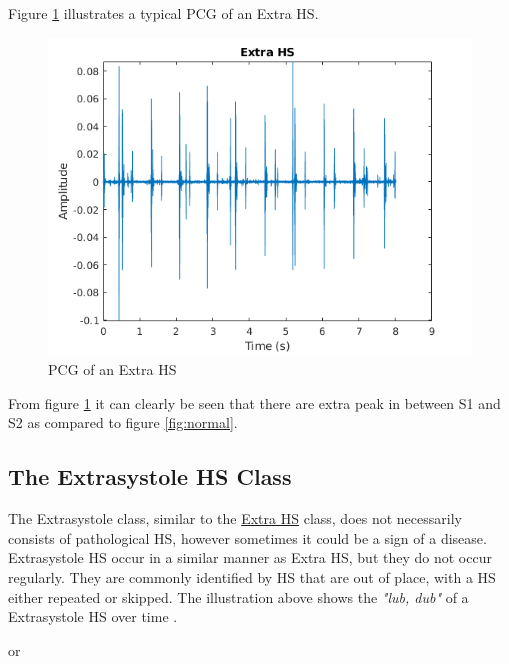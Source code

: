 \documentclass[10pt,twocolumn]{witseiepaper}
\begin{document}
Figure \ref{fig:extra} illustrates a typical PCG of an Extra HS.
\begin{figure}[h!]
    \centering
    \includegraphics[scale = 0.45]{./extra.png}
    \caption{PCG of an Extra HS}
    \label{fig:extra}
\end{figure}{}

From figure \ref{fig:extra} it can clearly be seen that there are extra peak in between S1 and S2 as compared to figure \ref{fig:normal}.

\subsection*{The Extrasystole HS Class}
The Extrasystole class, similar to the \hyperref[sec:extra]{Extra HS} class, does not necessarily consists of pathological HS, however sometimes it could be a sign of a disease. Extrasystole HS occur in a similar manner as Extra HS, but they do not occur regularly. They are commonly identified by HS that are out of place, with a HS either repeated or skipped. The illustration above shows the \textit{"lub, dub"} of a Extrasystole HS over time \cite{bentley}.


\hspace{3.5cm} or 

\end{document}
